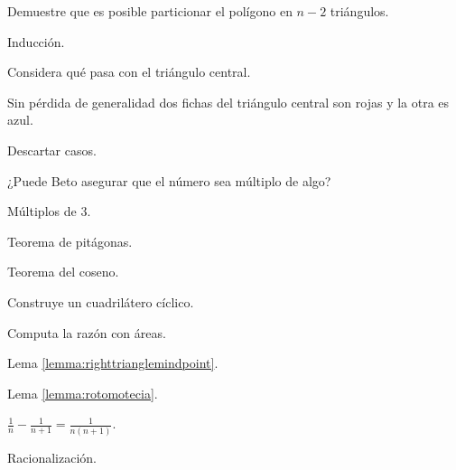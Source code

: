 
\begin{hint}\label{hint:sumapol1}
	Demuestre que es
	posible particionar el
	polígono en $n - 2$
	triángulos.
\end{hint}

\begin{hint}\label{hint:sumapol3}
	Inducción.
\end{hint}

\begin{hint}\label{elsalvador2015equilatero1}
	Considera qué pasa con el triángulo central.
\end{hint}

\begin{hint}\label{elsalvador2015equilatero2}
	Sin pérdida de generalidad dos fichas del triángulo
	central son rojas y la otra es azul.
\end{hint}

\begin{hint}\label{elsalvador2015equilatero3}
	Descartar casos.
\end{hint}

\begin{hint}\label{aliciabetomod3}
	¿Puede Beto asegurar que el número sea
	múltiplo de algo?
\end{hint}

\begin{hint}\label{aliciabetomod32}
	Múltiplos de $3$.
\end{hint}

\begin{hint}\label{ciclicoalgebra1}
	Teorema de pitágonas.
\end{hint}

\begin{hint}\label{ciclicoalgebra2}
	Teorema del coseno.
\end{hint}

\begin{hint}\label{ciclicoalgebra3}
	Construye un cuadrilátero cíclico.
\end{hint}

\begin{hint}\label{ciclicoalgebra4}
	Computa la razón con áreas.
\end{hint}

\begin{hint}\label{ricardojaja1}
	Lema \ref{lemma:righttrianglemindpoint}.
\end{hint}

\begin{hint}\label{rotomoteciacuadrilatero}
	Lema \ref{lemma:rotomotecia}.
\end{hint}

\begin{hint}\label{telescopica1}
	$\frac1n - \frac1{n + 1} = \frac1{n(n + 1)}$.
\end{hint}

\begin{hint}\label{racionalizacion}
	Racionalización.
\end{hint}
